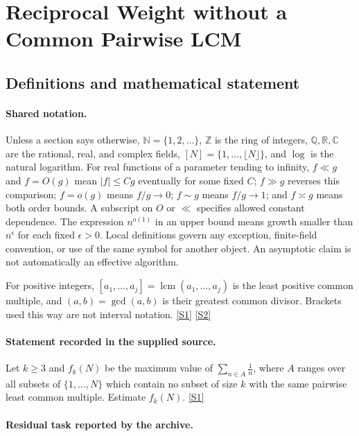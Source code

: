 \documentclass[11pt,a4paper]{article}
\newcommand{\N}{\mathbb{N}}
\newcommand{\Z}{\mathbb{Z}}
\newcommand{\Q}{\mathbb{Q}}
\newcommand{\R}{\mathbb{R}}
\newcommand{\C}{\mathbb{C}}
\newcommand{\sref}[2]{\hyperlink{source:#1:#2}{[S#2]}}
\begin{document}
\section{Reciprocal Weight without a Common Pairwise LCM}\label{statement}


\subsection{Definitions and mathematical statement}

\paragraph{Shared notation.}Unless a section says otherwise, $\N=\{1,2,\ldots\}$,
$\Z$ is the ring of integers, $\Q,\R,\C$ are the rational, real, and complex
fields, $[N]=\{1,\ldots,\lfloor N\rfloor\}$, and $\log$ is the natural
logarithm. For real functions of a parameter tending to infinity,
$f\ll g$ and $f=O(g)$ mean $|f|\leq Cg$ eventually for some fixed $C$;
$f\gg g$ reverses this comparison; $f=o(g)$ means $f/g\to0$;
$f\sim g$ means $f/g\to1$; and $f\asymp g$ means both order bounds.
A subscript on $O$ or $\ll$ specifies allowed constant dependence.
The expression $n^{o(1)}$ in an upper bound means growth smaller than
$n^\epsilon$ for each fixed $\epsilon>0$. Local definitions govern any
exception, finite-field convention, or use of the same symbol for another
object. An asymptotic claim is not automatically an effective algorithm.



For positive integers, $[a_1,\ldots,a_j]=\operatorname{lcm}(a_1,\ldots,a_j)$ is the least positive common multiple, and $(a,b)=\gcd(a,b)$ is their greatest common divisor. Brackets used this way are not interval notation. \sref{statement}{1} \sref{statement}{2}

\paragraph{Statement recorded in the supplied source.}
Let $k\geq 3$ and $f_k(N)$ be the maximum value of $\sum_{n\in A}\frac{1}{n}$, where $A$ ranges over all subsets of $\{1,\ldots,N\}$ which contain no subset of size $k$ with the same pairwise least common multiple.
Estimate $f_k(N)$. \sref{statement}{1}

\paragraph{Residual task reported by the archive.}
\end{document}
